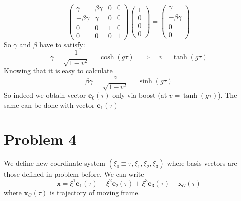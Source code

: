 \begin{equation}
	\begin{pmatrix}
		\gamma       & \beta\gamma & 0 & 0 \\
		-\beta\gamma & \gamma      & 0 & 0 \\
		0            & 0           & 1 & 0 \\
		0            & 0           & 0 & 1
	\end{pmatrix}
	\begin{pmatrix}
		1 \\
		0 \\
		0 \\
		0
	\end{pmatrix}
	=
	\begin{pmatrix}
		\gamma       \\
		-\beta\gamma \\
		0            \\
		0
	\end{pmatrix}
\end{equation}
%
So $\gamma$ and $\beta$ have to satisfy:
%
\begin{equation}
	\gamma = \frac{1}{\sqrt{1-v^2}} = \cosh(g\tau) \quad \Rightarrow \quad v = \tanh(g\tau)
\end{equation}
%
Knowing that it is easy to calculate
%
\begin{equation}
	\beta\gamma = \frac{v}{\sqrt{1-v^2}} = \sinh(g\tau)
\end{equation}
%
So indeed we obtain vector $\boldsymbol{e}_0(\tau)$ only via boost (at
$v=\tanh(g\tau)$). The same can be done with vector $\boldsymbol{e}_1(\tau)$

\section*{Problem 4}

We define new coordinate system $(\xi_0\equiv\tau, \xi_1, \xi_2, \xi_3)$ where
basis vectors are those defined in problem before. We can write
%
\begin{equation}
	\boldsymbol{x} = \xi^1\boldsymbol{e}_1(\tau) + \xi^2\boldsymbol{e}_2(\tau) +
	\xi^3\boldsymbol{e}_3(\tau) + \boldsymbol{x}_\mathcal{O}(\tau)
\end{equation}
%
where $\boldsymbol{x}_\mathcal{O}(\tau)$ is trajectory of moving frame.

